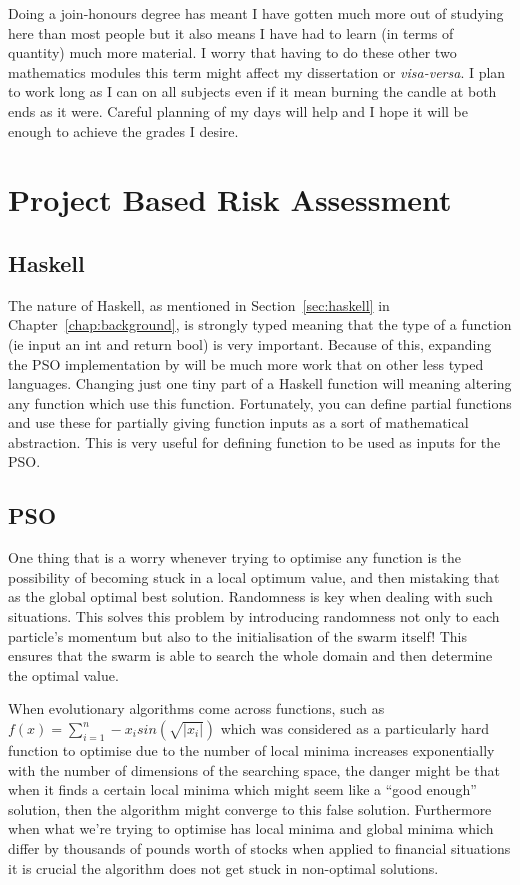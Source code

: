 \documentclass{pdfmx4020}
\begin{document}
    Doing a join-honours degree has meant I have gotten much more out of studying here than most people but it also means I have had to learn (in terms of quantity) much more material. I worry that having to do these other two mathematics modules this term might affect my dissertation or \textit{visa-versa}. I plan to work long as I can on all subjects even if it mean burning the candle at both ends as it were. Careful planning of my days will help and I hope it will be enough to achieve the grades I desire. 
  \section{Project Based Risk Assessment} %
  \label{sec:project_based}
    \subsection{Haskell} %
    \label{sub:haskell}
      The nature of Haskell, as mentioned in Section~\ref{sec:haskell} in Chapter~\ref{chap:background}, is strongly typed meaning that the type of a function (ie input an int and return bool) is very important. Because of this, expanding the PSO implementation by \cite{haskellPSO} will be much more work that on other less typed languages. Changing just one tiny part of a Haskell function will meaning altering any function which use this function. Fortunately, you can define partial functions and use these for partially giving function inputs as a sort of mathematical abstraction. This is very useful for defining function to be used as inputs for the PSO. 
    \subsection{PSO} %
    \label{sub:pso}
      One thing that is a worry whenever trying to optimise any function is the possibility of becoming stuck in a local optimum value, and then mistaking that as the global optimal best solution. Randomness is key when dealing with such situations. This solves this problem by introducing randomness not only to each particle's momentum but also to the initialisation of the swarm itself! This ensures that the swarm is able to search the whole domain and then determine the optimal value. 

      When evolutionary algorithms come across functions, such as $f(x)=\sum\limits_{i=1}^n -x_i sin(\sqrt{|x_i|})$ which was considered \cite{localmin} as a particularly hard function to optimise due to the number of local minima increases exponentially with the number of dimensions of the searching space, the danger might be that when it finds a certain local minima which might seem like a ``good enough'' solution, then the algorithm might converge to this false solution. Furthermore when what we're trying to optimise has local minima and global minima which differ by thousands of pounds worth of stocks when applied to financial situations it is crucial the algorithm does not get stuck in non-optimal solutions. 
\end{document}

